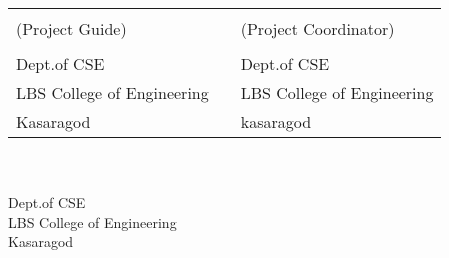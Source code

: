 	
	\begin{singlespace}
		\vspace*{2cm}
		\begin{table}[h!]
			\centering
			\begin{tabular}{p{7cm} p{0.9cm} p{7cm}} 
				\textbf{\guide} && \textbf{\projcordinatorA} \\
				(Project Guide) &&  (Project Coordinator)\\
				\guidedes & & \projcordinatorAdes\\ 
				Dept.of CSE && Dept.of CSE\\ 
				LBS College of Engineering & &LBS College of Engineering\\
				Kasaragod && kasaragod\\
			\end{tabular}
			
		\end{table}
		
		\vspace*{1.3cm}
		
		\begin{center}
			
			\textbf{\hod} \\ 
			\hoddes\\ 
			Dept.of CSE\\ 
			LBS College of Engineering\\
			Kasaragod\\
			
		\end{center}
	\end{singlespace}
	
	\thispagestyle{empty}




